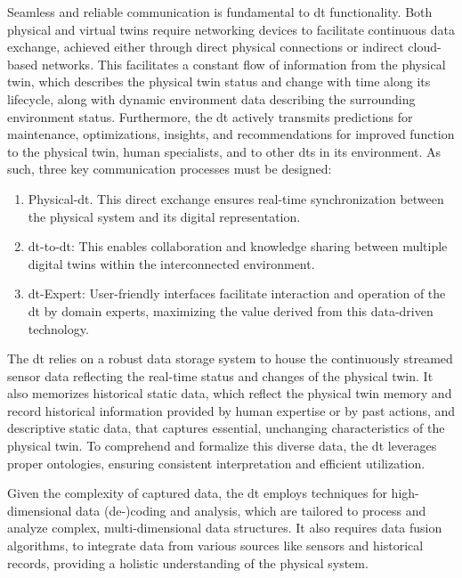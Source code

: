 Seamless and reliable communication is fundamental to \acrshort{dt} functionality. Both physical and virtual twins require networking devices to facilitate continuous data exchange, achieved either through direct physical connections or indirect cloud-based networks. This facilitates a constant flow of information from the physical twin, which describes the physical twin status and change with time along its lifecycle, along with dynamic environment data describing the surrounding environment status. Furthermore, the \acrshort{dt} actively transmits predictions for maintenance, optimizations, insights, and recommendations for improved function to the physical twin, human specialists, and to other \acrshort{dt}s in its environment. As such, three key communication processes must be designed:

\begin{enumerate}
    \item Physical-\acrshort{dt}. This direct exchange ensures real-time synchronization between the physical system and its digital representation.
    \item \acrshort{dt}-to-\acrshort{dt}: This enables collaboration and knowledge sharing between multiple digital twins within the interconnected environment.
    \item \acrshort{dt}-Expert: User-friendly interfaces facilitate interaction and operation of the \acrshort{dt} by domain experts, maximizing the value derived from this data-driven technology.
\end{enumerate}

The \acrshort{dt} relies on a robust data storage system to house the continuously streamed sensor data reflecting the real-time status and changes of the physical twin.
It also memorizes historical static data, which reflect the physical twin memory and record historical information provided by human expertise or by past actions, and descriptive static data, that captures essential, unchanging characteristics of the physical twin. To comprehend and formalize this diverse data, the \acrshort{dt} leverages proper ontologies, ensuring consistent interpretation and efficient utilization.

Given the complexity of captured data, the \acrshort{dt} employs techniques for high-dimensional data (de-)coding and analysis, which are tailored to process and analyze complex, multi-dimensional data structures. It also requires data fusion algorithms, to integrate data from various sources like sensors and historical records, providing a holistic understanding of the physical system.

